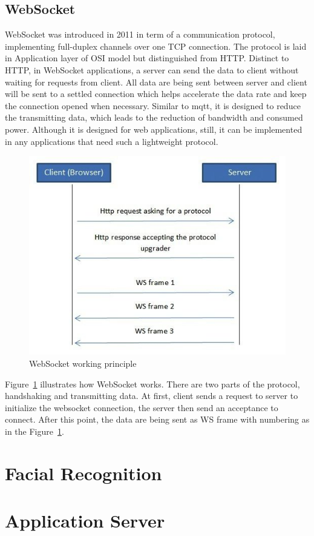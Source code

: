   \subsection{WebSocket}
    WebSocket was introduced in 2011 in term of a communication protocol, implementing full-duplex channels over one TCP connection. The protocol is laid in Application layer of OSI model but distinguished from HTTP. Distinct to HTTP, in WebSocket applications, a server can send the data to client without waiting for requests from client. All data are being sent between server and client will be sent to a settled connection which helps accelerate the data rate and keep the connection opened when necessary. Similar to \gls{mqtt}, it is designed to reduce the transmitting data, which leads to the reduction of bandwidth and consumed power. Although it is designed for web applications, still, it can be implemented in any applications that need such a lightweight protocol.
    \begin{figure}[!ht]
      \begin{center}
        \includegraphics[scale=0.7]{images/ws-1.jpg}
        \caption{WebSocket working principle}
        \label{fig:wsPrinciple}
      \end{center}
    \end{figure}
    Figure~\ref{fig:wsPrinciple} illustrates how WebSocket works. There are two parts of the protocol, handshaking and transmitting data. At first, client sends a request to server to initialize the websocket connection, the server then send an acceptance to connect. After this point, the data are being sent as WS frame with numbering as in the Figure~\ref{fig:wsPrinciple}.

\section{Facial Recognition}
\section{Application Server}




  


